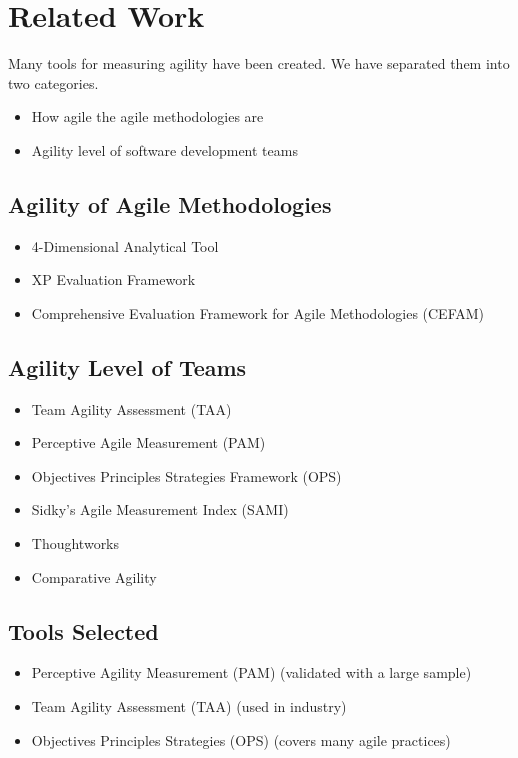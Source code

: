 \section{Related Work}

Many tools for measuring agility have been created. We have separated them into two categories. 

\begin{itemize}
	\item How agile the agile methodologies are
	\item Agility level of software development teams
\end{itemize}

\subsection{Agility of Agile Methodologies}

\begin{itemize}
	\item 4-Dimensional Analytical Tool
	\item XP Evaluation Framework
	\item Comprehensive Evaluation Framework for Agile Methodologies (CEFAM)
\end{itemize}

\subsection{Agility Level of Teams}

\begin{itemize}
	\item Team Agility Assessment (TAA)
	\item Perceptive Agile Measurement (PAM)
	\item Objectives Principles Strategies Framework (OPS)
	\item Sidky's Agile Measurement Index (SAMI)
	\item Thoughtworks
	\item Comparative Agility
\end{itemize}

\subsection{Tools Selected}

\begin{itemize}
	\item Perceptive Agility Measurement (PAM) \cite{pam} ({\footnotesize validated with a large sample})
	\item Team Agility Assessment (TAA) \cite{Leffingwell} ({\footnotesize used in industry})
	\item Objectives Principles Strategies (OPS) \cite{sventha_dissertation} ({\footnotesize covers many agile practices})
\end{itemize}


\clearpage

